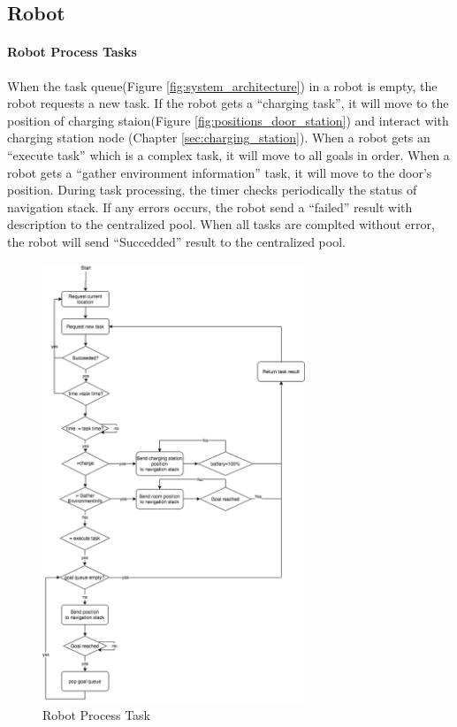 \subsection{Robot}

\paragraph{Robot Process Tasks}
When the task queue(Figure \ref{fig:system_architecture}) in a robot is empty, the robot requests a new task. If the robot gets a ``charging task'', it will move to the position of charging staion(Figure \ref{fig:positions_door_station}) and interact with charging station node (Chapter \ref{sec:charging_station}).
When a robot gets an ``execute task'' which is a complex task, it will move to all goals in order.
When a robot gets a ``gather environment information'' task, it will move to the door's position.
During task processing, the timer checks periodically the status of navigation stack. If any errors occurs, the robot send a ``failed'' result with description to the centralized pool.  
When all tasks are complted without error, the robot will send ``Succedded'' result to the centralized pool.


\begin{figure}[htbp]
    \centering
    \includegraphics[width = 0.7\textwidth]{content/images/ch4/robot_process_task.drawio.png}
    \caption{Robot Process Task }
    \label{fig:task_process_robot}
\end{figure}


